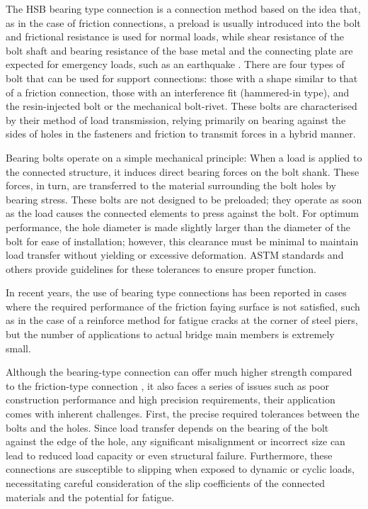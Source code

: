 The HSB bearing type connection is a connection method based on the idea that, as in the case of friction connections, a preload is usually introduced into the bolt and frictional resistance is used for normal loads, while shear resistance of the bolt shaft and bearing resistance of the base metal and the connecting plate are expected for emergency loads, such as an earthquake \cite{rivet1977}. There are four types of bolt that can be used for support connections: those with a shape similar to that of a friction connection, those with an interference fit (hammered-in type), and the resin-injected bolt or the mechanical bolt-rivet. These bolts are characterised by their method of load transmission, relying primarily on bearing against the sides of holes in the fasteners and friction to transmit forces in a hybrid manner.

Bearing bolts operate on a simple mechanical principle: When a load is applied to the connected structure, it induces direct bearing forces on the bolt shank. These forces, in turn, are transferred to the material surrounding the bolt holes by bearing stress. These bolts are not designed to be preloaded; they operate as soon as the load causes the connected elements to press against the bolt. For optimum performance, the hole diameter is made slightly larger than the diameter of the bolt for ease of installation; however, this clearance must be minimal to maintain load transfer without yielding or excessive deformation. ASTM standards \cite{ASTM-bolt} and others provide guidelines for these tolerances to ensure proper function.

In recent years, the use of bearing type connections has been reported\cite{morikawa2002} in cases where the required performance of the friction faying surface is not satisfied, such as in the case of a reinforce method for fatigue cracks at the corner of steel piers, but the number of applications to actual bridge main members is extremely small. 

Although the bearing-type connection can offer much higher strength compared to the friction-type connection \cite{Li2020bbolt,perry1981bearing,kim1999bearing}, it also faces a series of issues such as poor construction performance and high precision requirements, their application comes with inherent challenges. First, the precise required tolerances between the bolts and the holes. Since load transfer depends on the bearing of the bolt against the edge of the hole, any significant misalignment or incorrect size can lead to reduced load capacity or even structural failure. Furthermore, these connections are susceptible to slipping when exposed to dynamic or cyclic loads, necessitating careful consideration of the slip coefficients of the connected materials and the potential for fatigue.

